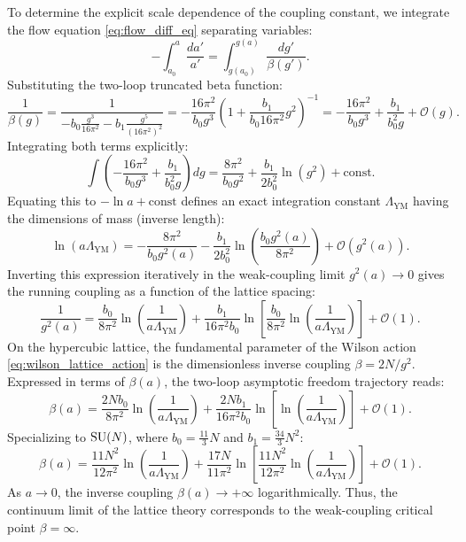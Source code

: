 To determine the explicit scale dependence of the coupling constant, we integrate the flow equation \eqref{eq:flow_diff_eq} separating variables:
\begin{equation}
\label{eq:separate_variables_flow}
-\int_{a_0}^a \frac{da'}{a'} = \int_{g(a_0)}^{g(a)} \frac{dg'}{\beta(g')}.
\end{equation}
Substituting the two-loop truncated beta function:
\begin{equation}
\frac{1}{\beta(g)} = \frac{1}{-b_0 \frac{g^3}{16\pi^2} - b_1 \frac{g^5}{(16\pi^2)^2}} = -\frac{16\pi^2}{b_0 g^3} \left( 1 + \frac{b_1}{b_0 16\pi^2} g^2 \right)^{-1} = -\frac{16\pi^2}{b_0 g^3} + \frac{b_1}{b_0^2 g} + \mathcal{O}(g).
\end{equation}
Integrating both terms explicitly:
\begin{equation}
\int \left( -\frac{16\pi^2}{b_0 g^3} + \frac{b_1}{b_0^2 g} \right) dg = \frac{8\pi^2}{b_0 g^2} + \frac{b_1}{2 b_0^2} \ln(g^2) + \mathrm{const}.
\end{equation}
Equating this to $-\ln a + \mathrm{const}$ defines an exact integration constant $\Lambda_{\mathrm{YM}}$ having the dimensions of mass (inverse length):
\begin{equation}
\label{eq:running_coupling_exact}
\ln(a \Lambda_{\mathrm{YM}}) = -\frac{8\pi^2}{b_0 g^2(a)} - \frac{b_1}{2 b_0^2} \ln\left( \frac{b_0 g^2(a)}{8\pi^2} \right) + \mathcal{O}(g^2(a)).
\end{equation}
Inverting this expression iteratively in the weak-coupling limit $g^2(a) \to 0$ gives the running coupling as a function of the lattice spacing:
\begin{equation}
\label{eq:running_coupling}
\frac{1}{g^2(a)} = \frac{b_0}{8\pi^2} \ln\left( \frac{1}{a \Lambda_{\mathrm{YM}}} \right) + \frac{b_1}{16\pi^2 b_0} \ln\left[ \frac{b_0}{8\pi^2} \ln\left( \frac{1}{a \Lambda_{\mathrm{YM}}} \right) \right] + \mathcal{O}(1).
\end{equation}
On the hypercubic lattice, the fundamental parameter of the Wilson action \eqref{eq:wilson_lattice_action} is the dimensionless inverse coupling $\beta = 2N/g^2$. Expressed in terms of $\beta(a)$, the two-loop asymptotic freedom trajectory reads:
\begin{equation}
\label{eq:lattice_beta_trajectory}
\beta(a) = \frac{2N b_0}{8\pi^2} \ln\left( \frac{1}{a \Lambda_{\mathrm{YM}}} \right) + \frac{2N b_1}{16\pi^2 b_0} \ln\left[ \ln\left( \frac{1}{a \Lambda_{\mathrm{YM}}} \right) \right] + \mathcal{O}(1).
\end{equation}
Specializing to $\mathrm{SU}(N)$, where $b_0 = \frac{11}{3}N$ and $b_1 = \frac{34}{3}N^2$:
\begin{equation}
\label{eq:lattice_beta_sun}
\beta(a) = \frac{11 N^2}{12\pi^2} \ln\left( \frac{1}{a \Lambda_{\mathrm{YM}}} \right) + \frac{17 N}{11\pi^2} \ln\left[ \frac{11 N^2}{12\pi^2} \ln\left( \frac{1}{a \Lambda_{\mathrm{YM}}} \right) \right] + \mathcal{O}(1).
\end{equation}
As $a \to 0$, the inverse coupling $\beta(a) \to +\infty$ logarithmically. Thus, the continuum limit of the lattice theory corresponds to the weak-coupling critical point $\beta = \infty$.

